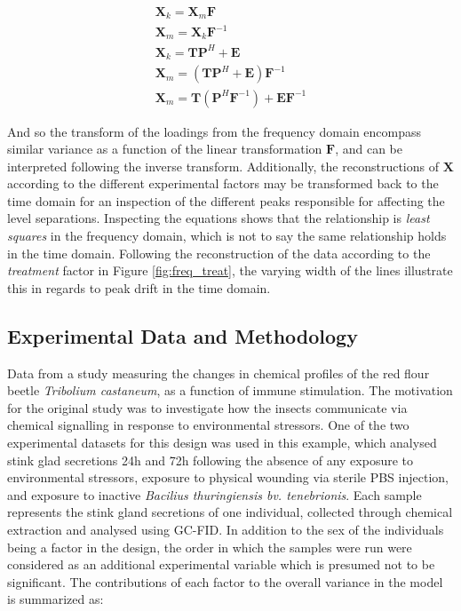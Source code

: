 \documentclass[preprint,12pt]{elsarticle}
\begin{document}
\begin{align}\label{eq:least_squares}
    \mathbf{X}_k = \mathbf{X}_m\mathbf{F}\\
    \mathbf{X}_m = \mathbf{X}_k\mathbf{F}^{-1}\\
    \mathbf{X}_k = \mathbf{T}\mathbf{P}^H + \mathbf{E}\\
    \mathbf{X}_m = \left(\mathbf{T}\mathbf{P}^H + \mathbf{E}\right)\mathbf{F}^{-1}\\
    \mathbf{X}_m = \mathbf{T}\left(\mathbf{P}^H\mathbf{F}^{-1}\right) + \mathbf{E}\mathbf{F}^{-1}
\end{align}

And so the transform of the loadings from the frequency domain encompass similar variance as a function of the linear transformation $\mathbf{F}$, and can be interpreted following the inverse transform. Additionally, the reconstructions of $\mathbf{X}$ according to the different experimental factors may be transformed back to the time domain for an inspection of the different peaks responsible for affecting the level separations. Inspecting the equations shows that the relationship is \textit{least squares} in the frequency domain, which is not to say the same relationship holds in the time domain. Following the reconstruction of the data according to the \textit{treatment} factor in Figure \ref{fig:freq_treat}, the varying width of the lines illustrate this in regards to peak drift in the time domain.

\subsection{Experimental Data and Methodology}

Data from a study measuring the changes in chemical profiles of the red flour beetle \textit{Tribolium castaneum}, as a function of immune stimulation. The motivation for the original study \cite{lo2023immune} was to investigate how the insects communicate via chemical signalling in response to environmental stressors. One of the two experimental datasets for this design was used in this example, which analysed stink glad secretions 24h and 72h following the absence of any exposure to environmental stressors, exposure to physical wounding via sterile PBS injection, and exposure to inactive \textit{Bacilius thuringiensis bv. tenebrionis}. Each sample represents the stink gland secretions of one individual, collected through chemical extraction and analysed using GC-FID. In addition to the sex of the individuals being a factor in the design, the order in which the samples were run were considered as an additional experimental variable which is presumed not to be significant. The contributions of each factor to the overall variance in the model is summarized as:
\end{document}
